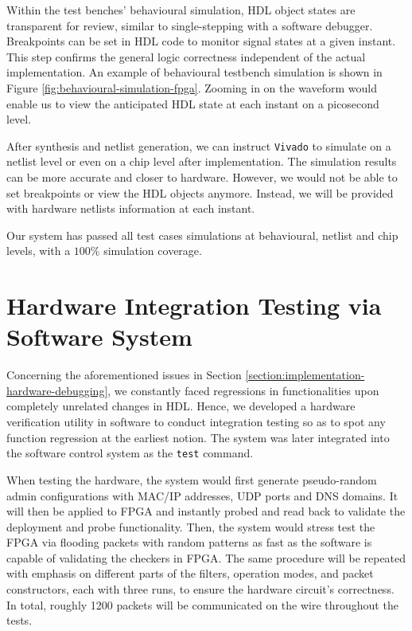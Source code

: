 \documentclass[a4paper]{report}
\newcommand{\code}{\texttt}
\begin{document}
Within the test benches' behavioural simulation, HDL object states are transparent for review, similar to single-stepping with a software debugger. Breakpoints can be set in HDL code to monitor signal states at a given instant. This step confirms the general logic correctness independent of the actual implementation. An example of behavioural testbench simulation is shown in Figure \ref{fig:behavioural-simulation-fpga}. Zooming in on the waveform would enable us to view the anticipated HDL state at each instant on a picosecond level.

After synthesis and netlist generation, we can instruct \code{Vivado} to simulate on a netlist level or even on a chip level after implementation. The simulation results can be more accurate and closer to hardware. However, we would not be able to set breakpoints or view the HDL objects anymore. Instead, we will be provided with hardware netlists information at each instant.

Our system has passed all test cases simulations at behavioural, netlist and chip levels, with a $100\%$ simulation coverage.

\section{Hardware Integration Testing via Software System}

Concerning the aforementioned issues in Section \ref{section:implementation-hardware-debugging}, we constantly faced regressions in functionalities upon completely unrelated changes in HDL. Hence, we developed a hardware verification utility in software to conduct integration testing so as to spot any function regression at the earliest notion. The system was later integrated into the software control system as the \code{test} command. 

When testing the hardware, the system would first generate pseudo-random admin configurations with MAC/IP addresses, UDP ports and DNS domains. It will then be applied to FPGA and instantly probed and read back to validate the deployment and probe functionality. Then, the system would stress test the FPGA via flooding packets with random patterns as fast as the software is capable of validating the checkers in FPGA. The same procedure will be repeated with emphasis on different parts of the filters, operation modes, and packet constructors, each with three runs, to ensure the hardware circuit's correctness. In total, roughly 1200 packets will be communicated on the wire throughout the tests. 
\end{document}
